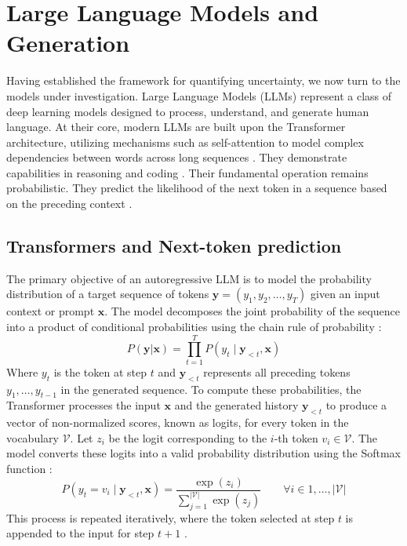 \section{Large Language Models and Generation}
\label{sec:background:llms}
Having established the framework for quantifying uncertainty,
we now turn to the models under investigation.
Large Language Models (LLMs) represent a class of 
deep learning models designed to process, 
understand, and generate human language. 
At their core, modern LLMs are built upon the 
Transformer architecture,
utilizing mechanisms such as self-attention to model 
complex dependencies between words across long sequences 
\parencite{NIPS2017_3f5ee243, naveed2024comprehensiveoverviewlargelanguage}.
They demonstrate capabilities in reasoning 
\parencite{wei2023chainofthoughtpromptingelicitsreasoning} 
and coding \parencite{tian2023chatgptultimateprogrammingassistant}.
Their fundamental operation remains probabilistic. They 
predict the likelihood of the next token in a sequence
based on the preceding context
\parencite{NIPS2017_3f5ee243, bahdanau2016neuralmachinetranslationjointly}.


\subsection{Transformers and Next-token prediction}
\label{sec:background:llms:transformers}
The primary objective of an autoregressive LLM is to model
the probability distribution of a target sequence of tokens
$\mathbf{y} = (y_1, y_2, \dots, y_T)$ given an input context or
prompt $\mathbf{x}$. The model decomposes the joint probability of
the sequence into a product of conditional probabilities
using the chain rule of probability 
\parencite{bahdanau2016neuralmachinetranslationjointly}:
\begin{equation}
    P(\mathbf{y} | \mathbf{x}) = \prod_{t=1}^{T} P(y_t \mid \mathbf{y}_{<t}, \mathbf{x})
    \label{eq:sequence_probability}
\end{equation}
Where $y_t$ is the token at step $t$ and $\mathbf{y}_{<t}$ represents
all preceding tokens $y_1, \dots, y_{t-1}$ in the generated sequence.
To compute these probabilities, the Transformer processes the 
input $\mathbf{x}$ and the generated history $\mathbf{y}_{<t}$ to produce a 
vector of non-normalized scores, known as logits, for every 
token in the vocabulary $\mathcal{V}$. Let $z_i$ be the logit 
corresponding to the $i$-th token $v_i \in \mathcal{V}$. The 
model converts these logits into a valid probability
distribution using the Softmax function
\parencite{10.1007/978-3-642-76153-9_28, NIPS2017_3f5ee243}:
\begin{equation}
    P(y_t = v_i \mid \mathbf{y}_{<t}, \mathbf{x})
	= \frac{\exp(z_i)}{\sum_{j=1}^{|\mathcal{V}|} \exp(z_j)} 
	\quad \quad \forall i \in {1, \dots, |\mathcal{V}|}
    \label{eq:logit_softmax}
\end{equation}
This process is repeated iteratively, where the token 
selected at step $t$ is appended to the input for step $t + 1$
\parencite{NIPS2017_3f5ee243}.


